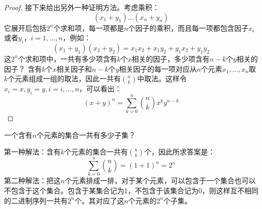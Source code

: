 \documentclass[10pt,a4paper,UTF8]{article}
\begin{document}
\begin{proof}
接下来给出另外一种证明方法。考虑乘积：
\begin{equation}
\label{eq:7}
(x_{1} + y_{1})\ldots  (x_{n} + y_{n})
\end{equation}
它展开后包括\(2^{n}\)个求和项，每一项都是\(n\)个因子的乘积，而且每一项都包含因子\(x_{i}\)或者\(y_{i}\)，\(i=1,\ldots ,n\)，例如：
\[(x_{1} + y_{1})(x_{2} + y_{2}) = x_{1}x_{2} + x_{1}y_{2} + y_{1}x_{2} + y_{1}y_{2}\]
这\(2^{n}\)个求和项中，一共有多少项含有\(k\)个\(x\)相关的因子，多少项含有\(n-k\)个\(y\)相关的因子？ 含有\(k\)个\(x\)相关因子和\(n-k\)个\(y\)相关因子的每一项对应从\(n\)个元素\(x_{1},\ldots ,x_{n}\)取\(k\)个元素组成一组的取法，因此一共有\(\binom{n}{k}\)中取法。这样令\(x_{i} = x,y_{i} = y,i=i,\ldots ,n\)，可以看出：
\begin{equation}
\label{eq:8}
(x+y)^{n} = \sum_{k=0}^{n}\binom{n}{k}x^{k}y^{n-k}
\end{equation}
\end{proof}

\begin{instance}
一个含有\(n\)个元素的集合一共有多少子集？
\end{instance}
\begin{answer}
第一种解法：含有\(k\)个元素的集合一共有\(\binom{n}{k}\)个，因此所求答案是：\[\sum_{k=0}^{n}\binom{n}{k} = (1+1)^{n} = 2^{n}\]
第二种解法：把这\(n\)个元素排成一排，对于某个元素，可以包含于一个集合也可以不包含于这个集合。包含于某集合记为1，不包含于该集合记为0，则这样互不相同的二进制序列一共有\(2^{n}\)个。其对应了这\(n\)个元素的\(2^{n}\)个子集。
\end{answer}
\end{document}
